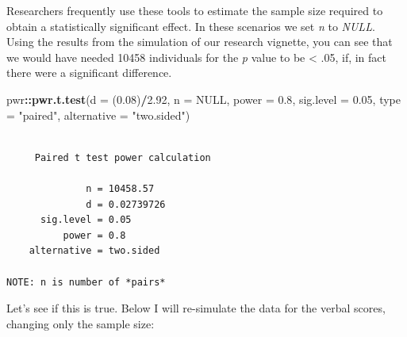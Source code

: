 \documentclass[
  11pt,
]{book}
\newenvironment{Shaded}{\begin{snugshade}}{\end{snugshade}}
\newcommand{\AttributeTok}[1]{\textcolor[rgb]{0.27,0.27,0.27}{#1}}
\newcommand{\ConstantTok}[1]{\textcolor[rgb]{0.37,0.37,0.37}{#1}}
\newcommand{\FloatTok}[1]{\textcolor[rgb]{0.06,0.06,0.06}{#1}}
\newcommand{\FunctionTok}[1]{\textcolor[rgb]{0.27,0.27,0.27}{\textbf{#1}}}
\newcommand{\NormalTok}[1]{#1}
\newcommand{\SpecialCharTok}[1]{\textcolor[rgb]{0.43,0.43,0.43}{\textbf{#1}}}
\newcommand{\StringTok}[1]{\textcolor[rgb]{0.5,0.5,0.5}{#1}}
\begin{document}
Researchers frequently use these tools to estimate the sample size required to obtain a statistically significant effect. In these scenarios we set \emph{n} to \emph{NULL}. Using the results from the simulation of our research vignette, you can see that we would have needed 10458 individuals for the \emph{p} value to be \textless{} .05, if, in fact there were a significant difference.

\begin{Shaded}
\begin{Highlighting}[]
\NormalTok{pwr}\SpecialCharTok{::}\FunctionTok{pwr.t.test}\NormalTok{(}\AttributeTok{d =}\NormalTok{ (}\FloatTok{0.08}\NormalTok{)}\SpecialCharTok{/}\FloatTok{2.92}\NormalTok{, }\AttributeTok{n =} \ConstantTok{NULL}\NormalTok{, }\AttributeTok{power =} \FloatTok{0.8}\NormalTok{, }\AttributeTok{sig.level =} \FloatTok{0.05}\NormalTok{,}
    \AttributeTok{type =} \StringTok{"paired"}\NormalTok{, }\AttributeTok{alternative =} \StringTok{"two.sided"}\NormalTok{)}
\end{Highlighting}
\end{Shaded}

\begin{verbatim}

     Paired t test power calculation 

              n = 10458.57
              d = 0.02739726
      sig.level = 0.05
          power = 0.8
    alternative = two.sided

NOTE: n is number of *pairs*
\end{verbatim}

Let's see if this is true. Below I will re-simulate the data for the verbal scores, changing only the sample size:
\end{document}
